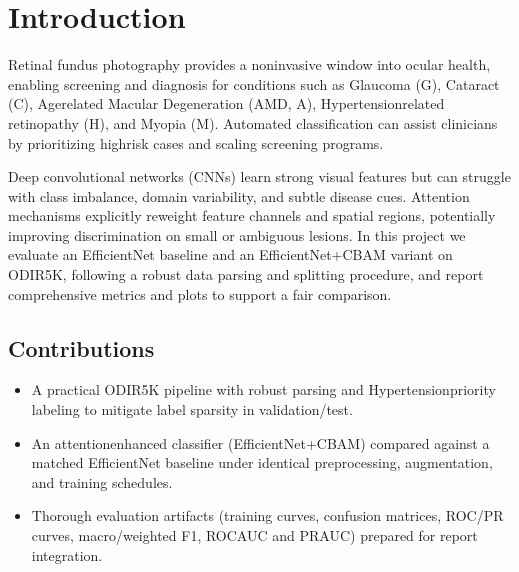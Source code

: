 \chapter{Introduction}
Retinal fundus photography provides a non\textendash invasive window into ocular health, enabling screening and diagnosis for conditions such as Glaucoma (G), Cataract (C), Age\textendash related Macular Degeneration (AMD, A), Hypertension\textendash related retinopathy (H), and Myopia (M). Automated classification can assist clinicians by prioritizing high\textendash risk cases and scaling screening programs.

Deep convolutional networks (CNNs) learn strong visual features but can struggle with class imbalance, domain variability, and subtle disease cues. Attention mechanisms explicitly reweight feature channels and spatial regions, potentially improving discrimination on small or ambiguous lesions. In this project we evaluate an EfficientNet baseline and an EfficientNet+CBAM variant on ODIR\textendash 5K, following a robust data parsing and splitting procedure, and report comprehensive metrics and plots to support a fair comparison.

\section{Contributions}
\begin{itemize}
  \item A practical ODIR\textendash 5K pipeline with robust parsing and Hypertension\textendash priority labeling to mitigate label sparsity in validation/test.
  \item An attention\textendash enhanced classifier (EfficientNet+CBAM) compared against a matched EfficientNet baseline under identical preprocessing, augmentation, and training schedules.
  \item Thorough evaluation artifacts (training curves, confusion matrices, ROC/PR curves, macro/weighted F1, ROC\textendash AUC and PR\textendash AUC) prepared for report integration.
\end{itemize}

